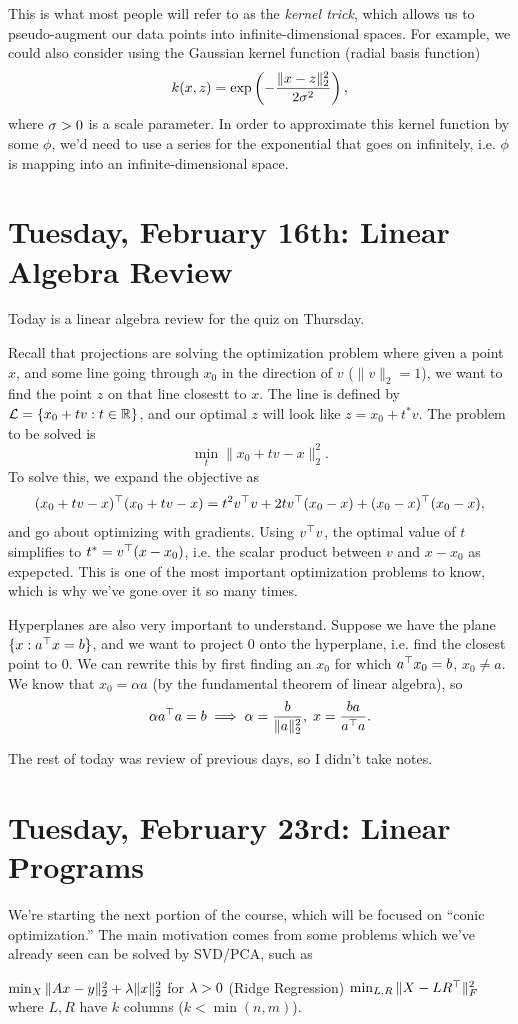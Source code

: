 \documentclass[11 pt]{scrartcl}
\begin{document}
This is what most people will refer to as the \emph{kernel trick}, which allows us to pseudo-augment our data points into infinite-dimensional spaces. 
For example, we could also consider using the Gaussian kernel function (radial basis function) 
\[ k(x,z) = \exp \left(-\dfrac{\|x-z\|^2_2}{2\sigma^2}\right),\] 
where $\sigma>0$ is a scale parameter. 
In order to approximate this kernel function by some $\phi$, we'd need to use a series for the exponential that goes on infinitely, i.e. $\phi$ is mapping into an infinite-dimensional space. 

\newpage
\section{Tuesday, February 16th: Linear Algebra Review}
Today is a linear algebra review for the quiz on Thursday.

Recall that projections are solving the optimization problem where given a point $x$, and some line going through $x_0$ in the direction of $v$ ($\|v\|_2 = 1$), we want to find the point $z$ on that line closestt to $x$. 
The line is defined by $\mathcal L = \{x_0 + tv : t\in \mathbb R\}$, and our optimal $z$ will look like $z = x_0 + t^* v$. 
The problem to be solved is 
\[ \min_t \|x_0 + tv - x\|_2^2.\] 
To solve this, we expand the objective as 
\[ (x_0+tv - x)^\top (x_0 + tv - x) =  t^2 v^\top v + 2tv^\top (x_0-x) + (x_0-x)^\top (x_0 - x) ,\]
and go about optimizing with gradients. 
Using $v^\top v$, the optimal value of $t$ simplifies to $t^* = v^\top (x-x_0)$, i.e. the scalar product between $v$ and $x-x_0$ as expepcted. 
This is one of the most important optimization problems to know, which is why we've gone over it so many times.

Hyperplanes are also very important to understand. 
Suppose we have the plane $\{x: a^\top x = b\}$, and we want to project $0$ onto the hyperplane, i.e. find the closest point to 0.
We can rewrite this by first finding an $x_0$ for which $a^\top x_0 = b$, $x_0\not= a$. 
We know that $x_0 = \alpha a$ (by the fundamental theorem of linear algebra), so 
\[ \alpha a^\top a = b \implies \alpha = \frac{b}{\|a\|_2^2},\; x = \frac{ba}{a^\top a}.\]

The rest of today was review of previous days, so I didn't take notes.

\newpage
\section{Tuesday, February 23rd: Linear Programs}
We're starting the next portion of the course, which will be focused on ``conic optimization.'' 
The main motivation comes from some problems which we've already seen can be solved by SVD/PCA, such as 
\begin{itemize}
    \ii $\min_{X} \|Ax-y\|_2^2 + \lambda \|x\|_2^2$ for $\lambda > 0$ (Ridge Regression)
    \ii $\min_{L,R} \|X-LR^\top\|_F^2$ where $L, R$ have $k$ columns ($k < \min(n,m)$). 
\end{itemize}
\end{document}
